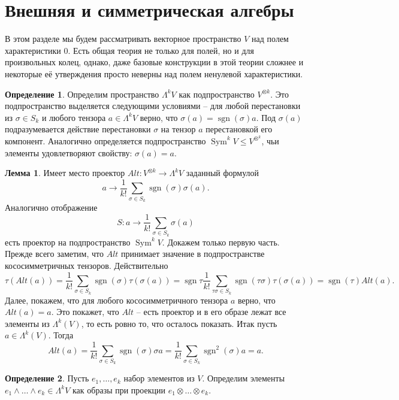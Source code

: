 \documentclass[10pt,a4paper,oneside]{book}
\theoremstyle{definition}
\newtheorem*{defn}{{\color{yellow!30!red} Определение}}
\newtheorem{lem}{{\color{green!50!black} Лемма}}
\newcommand{\Sym}{\operatorname{Sym}}
\newcommand{\sgn}{\operatorname{sgn}}
\def\dfn{\begin{defn}}
\def\edfn{\end{defn}}
\def\lm{\begin{lem}}
\def\elm{\end{lem}}
\begin{document}
\section{Внешняя и симметрическая алгебры}

В этом разделе мы будем рассматривать векторное пространство $V$ над полем характеристики $0$. Есть общая теория не только для полей, но и для произвольных колец, однако, даже базовые конструкции в этой теории сложнее и некоторые её утверждения просто неверны над полем ненулевой характеристики.

\dfn Определим пространство $\Lambda^k V$ как подпространство $V^{\otimes k}$. Это подпространство выделяется следующими условиями -- для любой перестановки из $\sigma \in S_k$ и любого тензора $a\in \Lambda^k V$ верно, что $\sigma(a)=\sgn(\sigma)a$. Под $\sigma(a)$ подразумевается действие перестановки $\sigma$ на тензор $a$ перестановкой его компонент. Аналогично определяется подпространство $\Sym^k V \leq V^{\otimes^k}$, чьи элементы удовлетворяют свойству: $\sigma(a)=a$.
\edfn

\lm Имеет место проектор $Alt \colon V^{\otimes k} \to \Lambda^k V$ заданный формулой 
$$a \to \frac{1}{k!} \sum_{\sigma \in S_k} \sgn (\sigma) \sigma(a).$$
Аналогично отображение  
$$S\colon a \to \frac{1}{k!} \sum_{\sigma \in S_k} \sigma(a)$$
есть проектор на подпространство $\Sym^k V$.
\proof Докажем только первую часть. Прежде всего заметим, что $Alt$ принимает значение в подпространстве кососимметричных тензоров. Действительно 
$$\tau(Alt(a))=\frac{1}{k!}\sum_{\sigma \in S_k}\sgn(\sigma) \tau(\sigma(a))= \sgn{\tau} \frac{1}{k!}\sum_{\tau\sigma \in S_k} \sgn(\tau\sigma) \tau(\sigma(a))=\sgn(\tau) Alt(a).$$
Далее, покажем, что для любого кососимметричного тензора $a$ верно, что $Alt(a)=a$. Это покажет, что $Alt$ -- есть проектор и в его образе лежат все элементы из $\Lambda^k(V)$, то есть ровно то, что осталось показать. Итак пусть $a\in \Lambda^k(V)$. Тогда 
$$Alt(a)=\frac{1}{k!} \sum_{\sigma \in S_k} \sgn (\sigma) \sigma a=\frac{1}{k!} \sum_{\sigma \in S_k} \sgn^2(\sigma) a=a.$$
\endproof
\elm

\dfn Пусть $e_1,\dots, e_k$ набор элементов из $V$. Определим элементы $e_1\wedge \dots \wedge e_k \in \Lambda^k V$ как образы при проекции $e_1\otimes \dots \otimes e_k$.
\edfn
\end{document}
